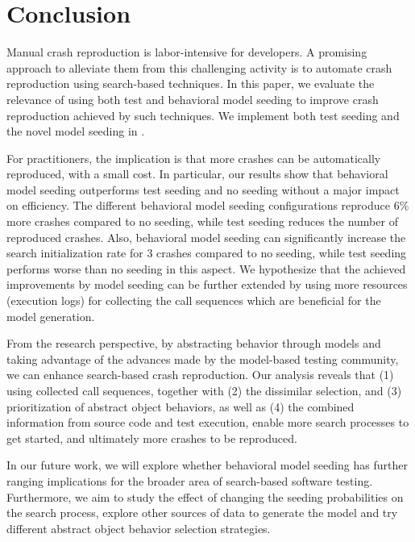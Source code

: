 

\section{Conclusion}
\label{sec:model_seeding:conclusion}

Manual crash reproduction is labor-intensive for developers.
A promising approach to alleviate them from this challenging activity is to automate crash reproduction using search-based techniques. In this paper, we evaluate the relevance of using both test and behavioral model seeding to improve crash reproduction achieved by such techniques. We implement both test seeding and the novel model seeding in \botsing.

For practitioners, the implication is that more crashes can be automatically reproduced, with a small cost. In particular, our results show that behavioral model seeding outperforms test seeding and no seeding without a major impact on efficiency. The different behavioral model seeding configurations reproduce 6\% more crashes compared to no seeding, while test seeding reduces the number of reproduced crashes. Also, behavioral model seeding can significantly increase the search initialization rate for 3 crashes compared to no seeding, while test seeding performs worse than no seeding in this aspect. We hypothesize that the achieved improvements by model seeding can be further extended by using more resources (\ie execution logs) for collecting the call sequences which are beneficial for the model generation.

From the research perspective, by abstracting behavior through models and taking advantage of the advances made by the model-based testing community, we can enhance search-based crash reproduction.
Our analysis reveals that (1) using collected call sequences, together with (2) the dissimilar selection, and (3) prioritization of abstract object behaviors, as well as (4) the combined information from source code and test execution, enable more search processes to get started, and ultimately more crashes to be reproduced.

In our future work, we will explore whether behavioral model seeding has further ranging implications for the broader area of search-based software testing. Furthermore, we aim to study the effect of changing the seeding probabilities on the search process, explore other sources of data to generate the model and try different abstract object behavior selection strategies.

